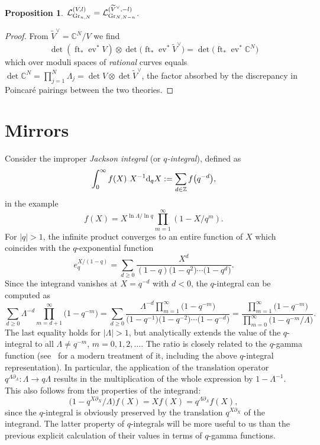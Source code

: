 \documentclass[pdftex]{sigma}
\numberwithin{equation}{section}
\newtheorem{Proposition}[Theorem]{Proposition}
{ \theoremstyle{definition}
\newtheorem{Definition}[Theorem]{Definition}
\newtheorem{Example}[Theorem]{Example}
\newtheorem{Remark}[Theorem]{Remark} }
\def\L{\mathcal L}
\def\ZZ{\mathbb Z}
\def\CC{\mathbb C}
\def\det{\operatorname{det}}
\def\tilde{\widetilde}
\def\p{\partial}
\def\ev{\operatorname{ev}}
\def\ft{\operatorname{ft}}
\begin{document}
\begin{Proposition}$\L_{{\rm Gr}_{n,N}}^{(V,l)}=\L_{{\rm Gr}_{N,N-n}}^{(\tilde{V}^{\vee},-l)}$.
\end{Proposition}

\begin{proof}
From $\tilde{V}^{\vee}=\CC^N/V$ we find
\[
\det (\ft_*\ev^*V) \otimes \det \big(\ft_*\ev^*\tilde{V}^{\vee}\big) = \det \big(\ft_*\ev^*\CC^N\big)
\]
which over moduli spaces of {\em rational} curves equals $\det \CC^N =\prod_{j=1}^N\Lambda_j=\det V \otimes \det \tilde{V}^{\vee}$,
the factor absorbed by the discrepancy in Poincar\'e pairings between the two theories.
\end{proof}


\section{Mirrors}
\label{Sec8}

Consider the improper {\em Jackson integral} (or {\em $q$-integral}), defined as
\[
\int_0^{\infty} f(X)\ X^{-1}{\rm d}_qX :=\sum_{d\in \ZZ} f\big(q^{-d}\big),
\]
in the example
\[
f(X)=X^{\ln \Lambda/\ln q} \prod_{m=1}^{\infty}(1-X/q^m).
\]
For $|q|>1$, the infinite product converges to an entire function of $X$
which coincides with the $q$-exponential function
\[ e_q^{X/(1-q)}=\sum_{d\geq 0}\frac{X^d}{(1-q)\big(1-q^2\big)\cdots\big(1-q^d\big)}.\]
Since the integrand vanishes at $X=q^{-d}$ with $d<0$, the $q$-integral can be computed as
\[
\sum_{d\geq 0}\Lambda^{-d}\prod_{m=d+1}^{\infty}\big(1-q^{-m}\big)=\sum_{d\geq 0}\frac{\Lambda^{-d}\prod_{m=1}^{\infty}\big(1-q^{-m}\big)}{\big(1-q^{-1}\big)\big(1-q^{-2}\big)\cdots \big(1-q^{-d}\big)} =
\frac{\prod_{m=1}^{\infty}\big(1-q^{-m}\big)}{\prod_{m=0}^{\infty}\big(1-q^{-m}/\Lambda\big)}.
\]
The last equality holds for $|\Lambda|>1$, but analytically
extends the value of the $q$-integral to all $\Lambda\neq q^{-m}$, $m=0,1,2,\dots$.
The ratio is closely related to the $q$-gamma function (see~\cite{DK} for a modern treatment of it, including the above $q$-integral representation). In particular, the application of the translation operator $q^{\Lambda\p_{\Lambda}}\colon \Lambda \to q\Lambda$ results in the multiplication of the whole expression by $1-\Lambda^{-1}$. This also follows from the properties of the integrand:
\[
\big(1-q^{X\p_X}/\Lambda\big) f(X) = X f(X) = q^{\Lambda\p_{\Lambda}} f(X),
\]
since the $q$-integral is obviously preserved by the translation $q^{X\p_X}$ of the integrand. The latter property of $q$-integrals will be more useful to us than the previous explicit calculation of their values in terms of $q$-gamma functions.
\end{document}
